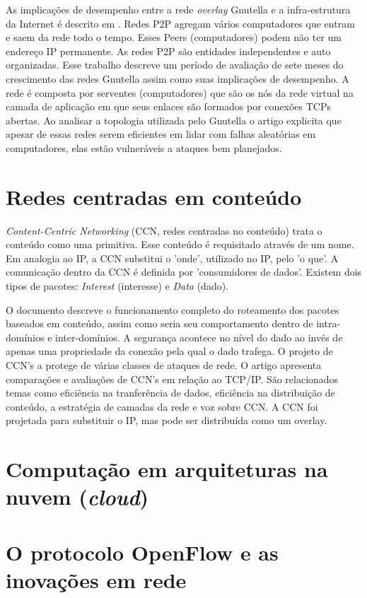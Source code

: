 As implicações de desempenho entre a rede \emph{overlay} Gnutella e a 
infra-estrutura da Internet é descrito em \citep{ripeanu2002mapping}. 
Redes P2P agregam vários computadores que entram e saem da rede todo o tempo. 
Esses Peers (computadores) podem não ter um endereço IP permanente. 
As redes P2P são entidades independentes e auto organizadas. 
Esse trabalho descreve um período de avaliação de sete meses do crescimento das 
redes Gnutella assim como suas implicações de desempenho. 
A rede é composta por serventes (computadores) que são os nós da rede virtual 
na camada de aplicação em que seus enlaces são formados por conexões 
TCPs abertas. 
Ao analisar a topologia utilizada pelo Gnutella o artigo explicita que apesar 
de essas redes serem eficientes em lidar com falhas aleatórias em computadores,
elas estão vulneráveis a ataques bem planejados.

\section{Redes centradas em conteúdo}

\emph{Content-Centric Networking} (CCN, redes centradas no conteúdo) trata o 
conteúdo como uma primitiva\citep{van2009networking}. 
Esse conteúdo é requisitado através de um nome. 
Em analogia ao IP, a CCN substitui o 'onde', utilizado no IP, pelo 'o que'. 
A comunicação dentro da CCN é definida por 'consumidores de dados'. 
Existem dois tipos de pacotes: \emph{Interest} (interesse) 
e \emph{Data} (dado).    

O documento descreve o funcionamento completo do roteamento dos pacotes 
baseados em conteúdo, assim como seria seu comportamento dentro de 
intra-domínios e inter-domínios. 
A segurança acontece no nível do dado ao invés de apenas uma propriedade da 
conexão pela qual o dado trafega. 
O projeto de CCN's a protege de várias classes de ataques de rede. 
O artigo apresenta comparações e avaliações de CCN's em relação ao TCP/IP. 
São relacionados temas como eficiência na tranferência de dados, 
eficiência na distribuição de conteúdo, a estratégia de camadas da rede 
e voz sobre CCN. 
A CCN foi projetada para substituir o IP, mas pode ser distribuída 
como um overlay. 


\section{Computação em arquiteturas na nuvem (\emph{cloud})}

\section{O protocolo OpenFlow e as inovações em rede}

